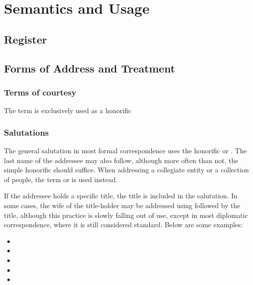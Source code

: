 \chapter{Semantics and Usage}

\section{Register}
\section{Forms of Address and Treatment}

\subsection{Terms of courtesy}

The term  is exclusively used as a honorific

\subsection{Salutations}

The general salutation in most formal correspondence uses the honorific  or . The last name of the addressee may also follow, although more often than not, the simple honorific should suffice. When addressing a collegiate entity or a collection of people, the term  or  is used instead.

If the addressee holds a specific title, the title is included in the salutation. In some cases, the wife of the title-holder may be addressed using  followed by the title, although this practice is slowly falling out of use, except in most diplomatic correspondence, where it is still considered standard. Below are some examples:


\begin{itemize}[nosep]
	\item {}
	\item {}
	\item {}
	\item {}
	\item {}
\end{itemize}

